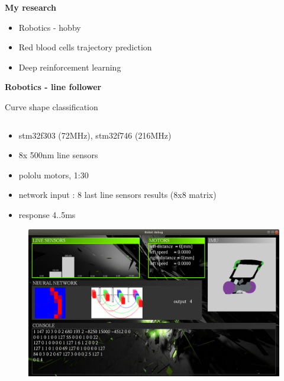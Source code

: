 \documentclass[xcolor=dvipsnames]{beamer}
\begin{document}
\begin{frame}{\bf My research}

\begin{itemize}
  \item Robotics - hobby
  \item Red blood cells trajectory prediction
  \item Deep reinforcement learning
\end{itemize}

\end{frame}


\begin{frame}{\bf Robotics - line follower}

Curve shape classification

\begin{columns}

    \begin{column}{0.5\textwidth}

    \begin{itemize}
      \item stm32f303 (72MHz), stm32f746 (216MHz)
      \item 8x 500nm line sensors
      \item pololu motors, 1:30
      \item network input : 8 last line sensors results (8x8 matrix)
      \item response 4..5ms
    \end{itemize}

        \begin{figure}
          \includegraphics[scale=0.1]{../../pictures/robot_debug_app.png}
        \end{figure}

    \end{column}


\end{columns}
\end{frame}
\end{document}
